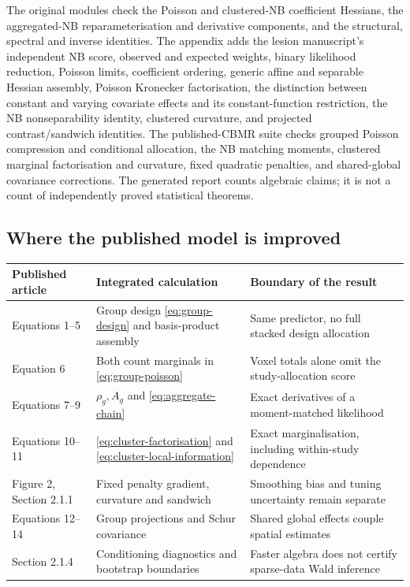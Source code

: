 \documentclass[11pt,a4paper]{article}
\numberwithin{equation}{section}
\begin{document}
The original modules check the Poisson and clustered-NB coefficient
Hessians, the aggregated-NB reparameterisation and derivative components,
and the structural, spectral and inverse identities. The appendix adds
the lesion manuscript's independent NB score, observed and expected weights, binary
likelihood reduction, Poisson limits, coefficient ordering, generic
affine and separable Hessian assembly, Poisson Kronecker factorisation,
the distinction between constant and varying covariate effects and its
constant-function restriction, the NB nonseparability identity, clustered curvature, and projected
contrast/sandwich identities. The published-CBMR suite checks grouped
Poisson compression and conditional allocation, the NB matching moments,
clustered marginal factorisation and curvature, fixed quadratic penalties,
and shared-global covariance corrections. The generated report counts
algebraic claims; it is not a count of independently proved statistical
theorems.

\subsection{Where the published model is improved}
\begin{center}\small
\begin{tabularx}{\textwidth}{lTT}
\toprule
Published article & Integrated calculation & Boundary of the result\\
\midrule
Equations 1--5 & Group design \eqref{eq:group-design} and basis-product assembly &
Same predictor, no full stacked design allocation\\
Equation 6 & Both count marginals in \eqref{eq:group-poisson} &
Voxel totals alone omit the study-allocation score\\
Equations 7--9 & $\rho_g,A_g$ and \eqref{eq:aggregate-chain} &
Exact derivatives of a moment-matched likelihood\\
Equations 10--11 & \eqref{eq:cluster-factorisation} and
\eqref{eq:cluster-local-information} &
Exact marginalisation, including within-study dependence\\
Figure 2, Section 2.1.1 & Fixed penalty gradient, curvature and sandwich &
Smoothing bias and tuning uncertainty remain separate\\
Equations 12--14 & Group projections and Schur covariance &
Shared global effects couple spatial estimates\\
Section 2.1.4 & Conditioning diagnostics and bootstrap boundaries &
Faster algebra does not certify sparse-data Wald inference\\
\bottomrule
\end{tabularx}
\end{center}
\end{document}
